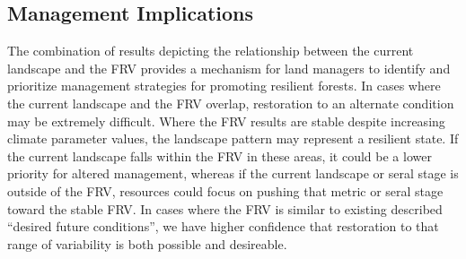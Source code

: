 \documentclass[12pt]{article}
\begin{document}
\begin{spacing}{1}

\subsection*{Management Implications} 
The combination of results depicting the relationship between the current landscape and the FRV provides a mechanism for land managers to identify and prioritize management strategies for promoting resilient forests. In cases where the current landscape and the FRV overlap, restoration to an alternate condition may be extremely difficult. Where the FRV results are stable despite increasing climate parameter values, the landscape pattern may represent a resilient state. If the current landscape falls within the FRV in these areas, it could be a lower priority for altered management, whereas if the current landscape or seral stage is outside of the FRV, resources could focus on pushing that metric or seral stage toward the stable FRV. In cases where the FRV is similar to existing described ``desired future conditions'', we have higher confidence that restoration to that range of variability is both possible and desireable.


\end{spacing}
\end{document}
